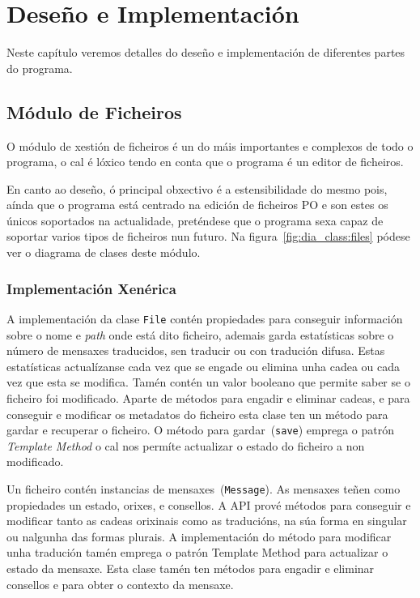 \chapter{Deseño e Implementación}

Neste capítulo veremos detalles do deseño e implementación de diferentes partes do programa.

\section{Módulo de Ficheiros}

O módulo de xestión de ficheiros é un do máis importantes e complexos de todo o programa, o cal é lóxico tendo en conta que o programa é un editor de ficheiros.

En canto ao deseño, ó principal obxectivo é a estensibilidade do mesmo pois, aínda que o programa está centrado na edición de ficheiros PO e son estes os únicos soportados na actualidade, preténdese que o programa sexa capaz de soportar varios tipos de ficheiros nun futuro. Na figura~\ref{fig:dia_class:files} pódese ver o diagrama de clases deste módulo.

\subsection{Implementación Xenérica}
A implementación da clase \lstinline{File} contén propiedades para conseguir información sobre o nome e \emph{path} onde está dito ficheiro, ademais garda estatísticas sobre o número de mensaxes traducidos, sen traducir ou con tradución difusa. Estas estatísticas actualízanse cada vez que se engade ou elimina unha cadea ou cada vez que esta se modifica. Tamén contén un valor booleano que permite saber se o ficheiro foi modificado. Aparte de métodos para engadir e eliminar cadeas, e para conseguir e modificar os metadatos do ficheiro esta clase ten un método para gardar e recuperar o ficheiro. O método para gardar~(\lstinline{save}) emprega o patrón \emph{Template Method}\cite{book:gang4pat} o cal nos permíte actualizar o estado do ficheiro a non modificado.

Un ficheiro contén instancias de mensaxes~(\lstinline{Message}). As mensaxes teñen como propiedades un estado, orixes, e consellos. A API prové métodos para conseguir e modificar tanto as cadeas orixinais como as traducións, na súa forma en singular ou nalgunha das formas plurais. A implementación do método para modificar unha tradución tamén emprega o patrón Template Method para actualizar o estado da mensaxe. Esta clase tamén ten métodos para engadir e eliminar consellos e para obter o contexto da mensaxe.

